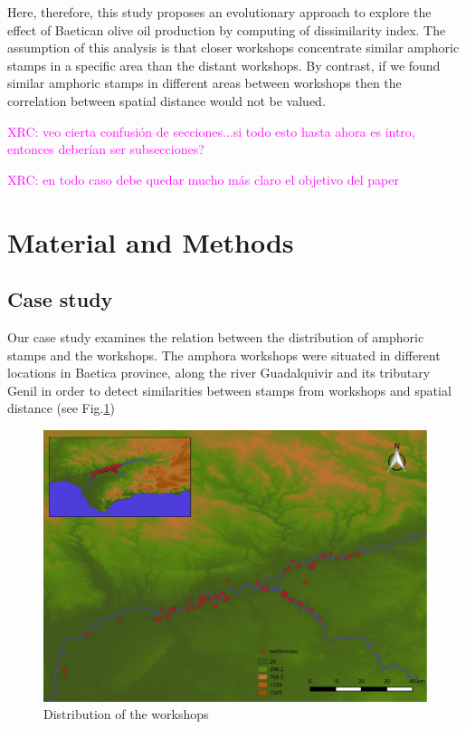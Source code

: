\documentclass[review]{elsarticle}
\newcommand{\memo}[2]{\textcolor{#1}{#2}}
\newcommand{\xavi}[1]{\memo{magenta}{XRC: #1\\}}
\begin{document}
Here, therefore, this study proposes an evolutionary approach to explore the effect of Baetican olive oil production by computing of dissimilarity index. The assumption of this analysis is that closer workshops concentrate similar amphoric stamps in a specific area than the distant workshops. By contrast, if we found similar amphoric stamps in different areas between workshops then the correlation between spatial distance would not be valued.  




\xavi{veo cierta confusión de secciones...si todo esto hasta ahora es intro, entonces deberían ser subsecciones?}

\xavi{en todo caso debe quedar mucho más claro el objetivo del paper}

\section{Material and Methods}

\subsection{Case study}

Our case study examines the relation between the distribution of amphoric stamps and the workshops. The amphora workshops were situated in different locations in Baetica province, along the river Guadalquivir and its tributary Genil in order to detect similarities between stamps from workshops and spatial distance (see Fig.\ref{workshop})

\begin{figure}[htp]
	\centering
\includegraphics[width=\linewidth]{figs/workshop}
\caption{Distribution of the workshops}
\label{workshop}
\end{figure} 
\end{document}
